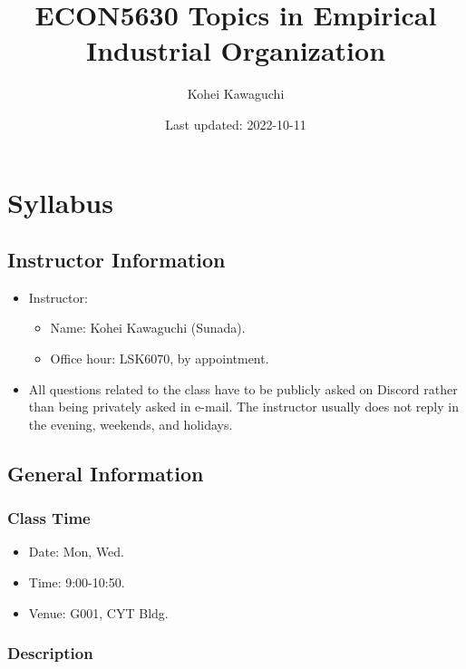 \documentclass[
]{book}
\title{ECON5630 Topics in Empirical Industrial Organization}
\author{Kohei Kawaguchi}
\date{Last updated: 2022-10-11}
\providecommand{\tightlist}{%
  \setlength{\itemsep}{0pt}\setlength{\parskip}{0pt}}
\begin{document}
\maketitle

{
\setcounter{tocdepth}{1}
\tableofcontents
}
\hypertarget{syllabus}{%
\chapter{Syllabus}\label{syllabus}}

\hypertarget{instructor-information}{%
\section{Instructor Information}\label{instructor-information}}

\begin{itemize}
\tightlist
\item
  Instructor:

  \begin{itemize}
  \tightlist
  \item
    Name: Kohei Kawaguchi (Sunada).
  \item
    Office hour: LSK6070, by appointment.
  \end{itemize}
\item
  All questions related to the class have to be publicly asked on Discord rather than being privately asked in e-mail. The instructor usually does not reply in the evening, weekends, and holidays.
\end{itemize}

\hypertarget{general-information}{%
\section{General Information}\label{general-information}}

\hypertarget{class-time}{%
\subsection{Class Time}\label{class-time}}

\begin{itemize}
\tightlist
\item
  Date: Mon, Wed.
\item
  Time: 9:00-10:50.
\item
  Venue: G001, CYT Bldg.
\end{itemize}

\hypertarget{description}{%
\subsection{Description}\label{description}}
\end{document}
